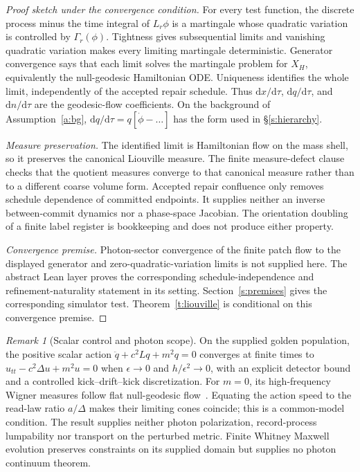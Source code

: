 \documentclass[11pt]{article}
\theoremstyle{remark}
\newtheorem{remark}[theorem]{Remark}
\newcommand{\Dd}{\mathrm{d}}
\begin{document}
\begin{proof}[Proof sketch under the convergence condition]
For every test function, the discrete process minus the time integral of
$L_r\phi$ is a martingale whose quadratic variation is controlled by
$\Gamma_r(\phi)$. Tightness gives subsequential limits and vanishing
quadratic variation makes every limiting martingale deterministic. Generator
convergence says that each limit solves the martingale problem for $X_H$,
equivalently the null-geodesic Hamiltonian ODE. Uniqueness identifies the
whole limit, independently of the accepted repair schedule. Thus
$\Dd x/\Dd\tau$, $\Dd q/\Dd\tau$, and $\Dd\hat n/\Dd\tau$ are the
geodesic-flow coefficients. On the background of Assumption~\ref{a:bg},
$\Dd q/\Dd\tau=q[\dot\phi-\ldots]$ has the form used in
\S\ref{s:hierarchy}.

\emph{Measure preservation.} The identified limit is Hamiltonian flow on the
mass shell, so it preserves the canonical Liouville measure. The finite
measure-defect clause checks that the quotient measures converge to that
canonical measure rather than to a different coarse volume form. Accepted repair confluence
only removes schedule dependence of committed endpoints. It supplies neither
an inverse between-commit dynamics nor a phase-space Jacobian. The
orientation doubling of a finite label register is bookkeeping and does not
produce either property.

\emph{Convergence premise.} Photon-sector convergence of the finite patch flow to
the displayed generator and zero-quadratic-variation limits is not supplied here. The abstract Lean
layer proves the corresponding schedule-independence and refinement-naturality
statement in its setting. Section~\ref{s:premises} gives the corresponding
simulator test. Theorem~\ref{t:liouville} is conditional on this convergence
premise.
\end{proof}

\begin{remark}[Scalar control and photon scope]\label{r:scalar-continuum}
On the supplied golden population, the positive scalar action
\(\ddot q+c^2Lq+m^2q=0\) converges at finite times to
\(u_{tt}-c^2\Delta u+m^2u=0\) when \(\epsilon\to0\) and
\(h/\epsilon^2\to0\), with an explicit detector bound and a controlled
kick--drift--kick discretization. For \(m=0\), its high-frequency Wigner
measures follow flat null-geodesic flow~\cite{lionspaul}. Equating the action speed to the
read-law ratio \(a/\Delta\) makes their limiting cones coincide; this is
a common-model condition. The result supplies neither photon polarization,
record-process lumpability nor transport on the perturbed metric. Finite
Whitney Maxwell evolution preserves constraints on its supplied domain
but supplies no photon continuum theorem.
\end{remark}
\end{document}
